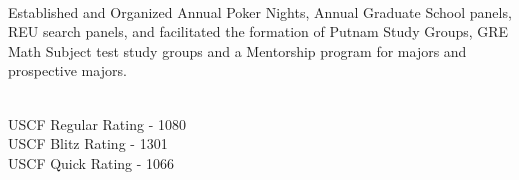 \documentclass[]{deedy-resume-openfont}
\begin{document}
\begin{minipage}[t]{0.44\textwidth}
\vspace{8}

\\
Established and Organized Annual Poker Nights, Annual Graduate School panels, REU search panels, and facilitated the formation of Putnam Study Groups, GRE Math Subject test study groups and a Mentorship program for majors and prospective majors.
\sectionsep

\vspace{8}

\\
USCF Regular Rating - 1080\\
USCF Blitz Rating  - 1301\\
USCF Quick Rating - 1066\\
\sectionsep







%
%

\end{minipage} 
\hfill
\end{document}
